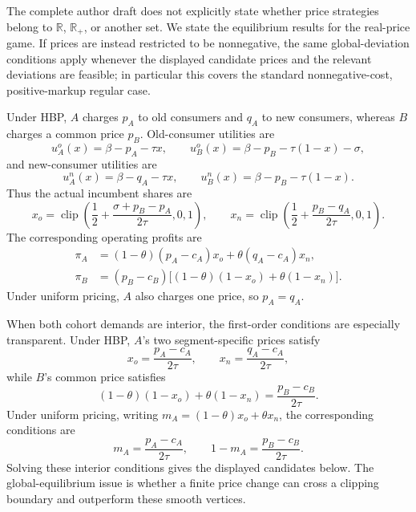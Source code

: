 \documentclass[11pt]{article}
\newcommand{\clip}{\operatorname{clip}}
\begin{document}
The complete author draft does not explicitly state whether price strategies
belong to $\mathbb R$, $\mathbb R_+$, or another set. We state the equilibrium
results for the real-price game. If prices are instead restricted to be
nonnegative, the same global-deviation conditions apply whenever the displayed
candidate prices and the relevant deviations are feasible; in particular this
covers the standard nonnegative-cost, positive-markup regular case.

Under HBP, $A$ charges $p_A$ to old consumers and $q_A$ to new consumers,
whereas $B$ charges a common price $p_B$. Old-consumer utilities are
\[
 u_A^o(x)=\beta-p_A-\tau x,\qquad
 u_B^o(x)=\beta-p_B-\tau(1-x)-\sigma,
\]
and new-consumer utilities are
\[
 u_A^n(x)=\beta-q_A-\tau x,\qquad
 u_B^n(x)=\beta-p_B-\tau(1-x).
\]
Thus the actual incumbent shares are
\[
 x_o=\clip\!\left(\frac12+\frac{\sigma+p_B-p_A}{2\tau},0,1\right),
 \qquad
 x_n=\clip\!\left(\frac12+\frac{p_B-q_A}{2\tau},0,1\right).
\]
The corresponding operating profits are
\begin{align}
 \pi_A&=(1-\theta)(p_A-c_A)x_o
       +\theta(q_A-c_A)x_n,\\
 \pi_B&=(p_B-c_B)\bigl[(1-\theta)(1-x_o)+\theta(1-x_n)\bigr].
\end{align}
Under uniform pricing, $A$ also charges one price, so $p_A=q_A$.

When both cohort demands are interior, the first-order conditions are especially
transparent.  Under HBP, $A$'s two segment-specific prices satisfy
\begin{equation}
 x_o=\frac{p_A-c_A}{2\tau},
 \qquad
 x_n=\frac{q_A-c_A}{2\tau},
 \label{eq:hbpAfoc}
\end{equation}
while $B$'s common price satisfies
\begin{equation}
 (1-\theta)(1-x_o)+\theta(1-x_n)
 =\frac{p_B-c_B}{2\tau}.
 \label{eq:hbpBfoc}
\end{equation}
Under uniform pricing, writing
$m_A=(1-\theta)x_o+\theta x_n$, the corresponding conditions are
\begin{equation}
 m_A=\frac{p_A-c_A}{2\tau},
 \qquad
 1-m_A=\frac{p_B-c_B}{2\tau}.
 \label{eq:uniformfoc}
\end{equation}
Solving these interior conditions gives the displayed candidates below.  The
global-equilibrium issue is whether a finite price change can cross a clipping
boundary and outperform these smooth vertices.
\end{document}
